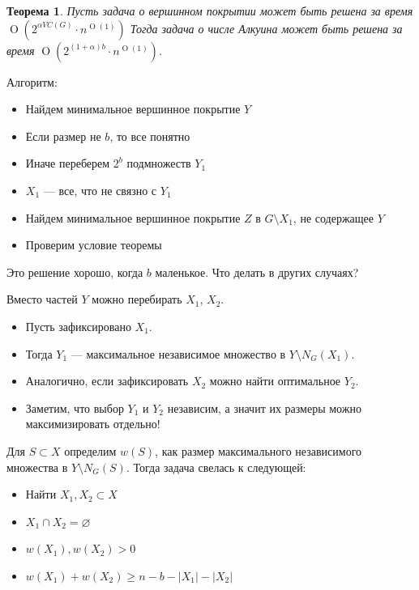 \documentclass{beamer}
\newtheorem{thm}{Теорема}
\theoremstyle{definition}
\newcommand{\otime}[1]{\operatorname{O}(#1)}
\newcommand{\opoly}[1]{\otime{#1\cdot n^{\otime{1}}}}
\begin{document}
\begin{frame}
\begin{thm}
Пусть задача о вершинном покрытии может быть решена
за время $\opoly{2^{\alpha VC(G)}}$
Тогда задача о числе Алкуина может быть решена за время $\opoly{2^{(1+\alpha)b}}$. 
\end{thm}
Алгоритм:
\begin{itemize}
\item Найдем минимальное вершинное покрытие $Y$
\item Если размер не $b$, то все понятно
\item Иначе переберем $2^b$ подмножеств $Y_1$
\item $X_1$ --- все, что не связно с $Y_1$
\item Найдем минимальное вершинное покрытие $Z$ в $G \setminus X_1$, не содержащее $Y$
\item Проверим условие теоремы
\end{itemize}
\end{frame}

\begin{frame}
Это решение хорошо, когда $b$ маленькое. Что делать в других случаях?
\end{frame}

\begin{frame}
Вместо частей $Y$ можно перебирать $X_1$, $X_2$.
\begin{itemize}
\item Пусть зафиксировано $X_1$. 
\item Тогда $Y_1$ --- максимальное независимое множество в $Y \setminus N_G(X_1)$.
\item Аналогично, если зафиксировать $X_2$ можно найти оптимальное $Y_2$.
\item Заметим, что выбор $Y_1$ и $Y_2$ независим, а значит их размеры можно максимизировать отдельно!
\end{itemize}
\end{frame}

\begin{frame}
Для $S \subset X$ определим $w(S)$, как размер максимального независимого множества в $Y \setminus N_G(S)$.
Тогда задача свелась к следующей:
\begin{itemize}
\item Найти $X_1, X_2 \subset X$
\item $X_1 \cap X_2 = \varnothing$
\item $w(X_1), w(X_2) > 0$
\item $w(X_1) + w(X_2) \ge n - b - |X_1| - |X_2|$
\end{itemize}
\end{frame}
\end{document}

